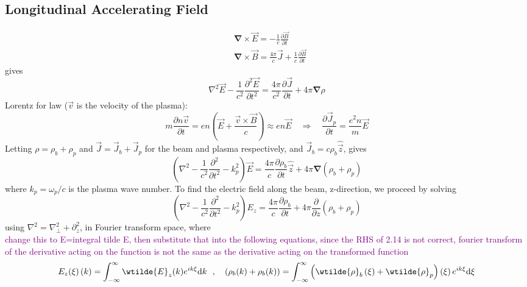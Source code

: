 \subsection{Longitudinal Accelerating Field} 
\begin{align}
&\boldsymbol{\nabla}\times \vec{E}=-\frac{1}{c}\frac{\partial \vec{B}}{\partial t} \\
&\boldsymbol{\nabla}\times \vec{B}=\frac{4\pi}{c}\vec{J}+\frac{1}{c}\frac{\partial \vec{B}}{\partial t}
\end{align}
gives
\begin{equation}
\nabla^2\vec{E}-\frac{1}{c^2}\frac{\partial^2 \vec{E}}{\partial t^2}=\frac{4\pi}{c^2}\frac{\partial \vec{J}}{\partial t}+4\pi\boldsymbol{\nabla}\rho
\end{equation}
Lorentz for law ($\vec{v}$ is the velocity of the plasma):
\begin{equation}
m\frac{\partial n\vec{v}}{\partial t}=en\left(\vec{E}+\frac{\vec{v}\times\vec{B}}{c} \right)\approx en\vec{E} \quad \Rightarrow \quad
\frac{\partial \vec{J}_p}{\partial t}=\frac{e^2 n}{m}\vec{E}
\end{equation}
Letting $\rho=\rho_b+\rho_p$ and $\vec{J}=\vec{J}_b+\vec{J}_p$ for the beam and plasma respectively, and $\vec{J}_b=c\rho_b\hat{\vec{z}}$, gives
\begin{equation}
\left(\nabla^2-\frac{1}{c^2}\frac{\partial^2}{\partial t^2}-k_p^2\right)\vec{E}=\frac{4\pi}{c}\frac{\partial \rho_b}{\partial t}\hat{\vec{z}}+4\pi\boldsymbol{\nabla}\left(\rho_b+\rho_p\right)
\end{equation}
where $k_p=\omega_p/c$ is the plasma wave number. To find the electric field along the beam, z-direction, we proceed by solving
\begin{equation}
\left(\nabla^2-\frac{1}{c^2}\frac{\partial^2}{\partial t^2}-k_p^2\right)E_z=\frac{4\pi}{c}\frac{\partial \rho_b}{\partial t}+4\pi\frac{\partial}{\partial z}\left(\rho_b+\rho_p\right)
\end{equation}
using $\nabla^2=\nabla^2_{\perp}+\partial^2_z$, in Fourier transform space, where\\
\textcolor{purple}{change this to E=integral tilde E, then substitute that into the following equations, since the RHS of 2.14 is not correct, fourier transform of the derivative acting on the function is not the same as the derivative acting on the transformed function}
\begin{equation}
E_z(\xi)\left(k\right)=\int_ {-\infty}^{\infty}\wtilde{E}_z(k)e^{ik\xi}\mathrm{d}k~~,~~~\left(\rho_b(k)+\rho_b(k)\right)=\int_ {-\infty}^{\infty}\left(\wtilde{\rho}_b\left(\xi\right)+\wtilde{\rho}_p\right)\left(\xi\right)e^{ik\xi}\mathrm{d}\xi
\end{equation}
